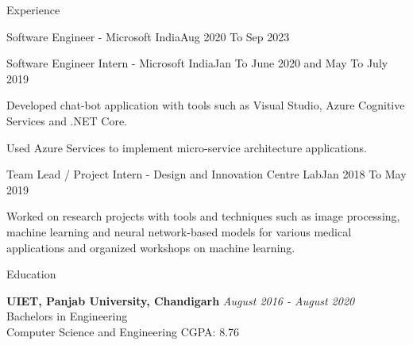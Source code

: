 \documentclass{resume} %
\begin{document}
\begin{rSection}{Experience}
\begin{rSubsection}{Software Engineer - Microsoft India}{Aug 2020 To Sep 2023}{}{}
        \end{rSubsection}


        \begin{rSubsection}{Software Engineer Intern - Microsoft India}{Jan To June 2020 and May To July 2019}{}{}

            \item Developed chat-bot application with tools such as Visual Studio, Azure Cognitive Services and .NET Core.
            \item Used Azure Services to implement micro-service architecture applications.
            
        \end{rSubsection}


        \begin{rSubsection}{Team Lead / Project Intern - Design and Innovation Centre Lab}{Jan 2018 To May 2019}{}{}

            \item Worked on research projects with tools and techniques such as image processing, machine learning and neural network-based models for various medical applications and organized workshops on machine learning.

        \end{rSubsection}

    \end{rSection}




    \begin{rSection}{Education}

        {\bf UIET, Panjab University, Chandigarh} \hfill {\em August 2016 - August 2020} 
        \\ Bachelors in Engineering
        \\ Computer Science and Engineering \hfill{CGPA: 8.76}
        
    \end{rSection}


\end{document}
